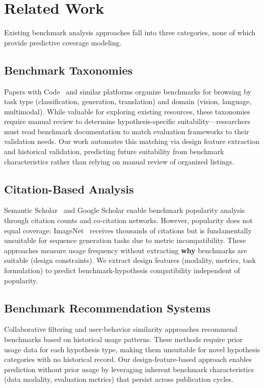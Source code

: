 \section{Related Work}

Existing benchmark analysis approaches fall into three categories, none of which provide predictive coverage modeling.

\subsection{Benchmark Taxonomies}

Papers with Code~\cite{paperswithcode} and similar platforms organize benchmarks for browsing by task type (classification, generation, translation) and domain (vision, language, multimodal). While valuable for exploring existing resources, these taxonomies require manual review to determine hypothesis-specific suitability---researchers must read benchmark documentation to match evaluation frameworks to their validation needs. Our work automates this matching via design feature extraction and historical validation, predicting future suitability from benchmark characteristics rather than relying on manual review of organized listings.

\subsection{Citation-Based Analysis}

Semantic Scholar~\cite{semanticscholar} and Google Scholar enable benchmark popularity analysis through citation counts and co-citation networks. However, popularity does not equal coverage: ImageNet~\cite{imagenet} receives thousands of citations but is fundamentally unsuitable for sequence generation tasks due to metric incompatibility. These approaches measure usage frequency without extracting \textbf{why} benchmarks are suitable (design constraints). We extract design features (modality, metrics, task formulation) to predict benchmark-hypothesis compatibility independent of popularity.

\subsection{Benchmark Recommendation Systems}

Collaborative filtering and user-behavior similarity approaches recommend benchmarks based on historical usage patterns. These methods require prior usage data for each hypothesis type, making them unsuitable for novel hypothesis categories with no historical record. Our design-feature-based approach enables prediction without prior usage by leveraging inherent benchmark characteristics (data modality, evaluation metrics) that persist across publication cycles.

